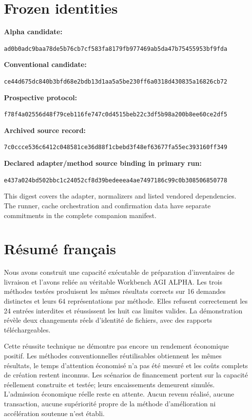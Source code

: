 \documentclass[11pt,a4paper]{article}
\begin{document}
\section*{Frozen identities}
\small
\textbf{Alpha candidate:}\par
\nolinkurl{ad0b0adc9baa78de5b76cb7cf583fa8179fb977469ab5da47b75455953bf9fda}\par
\textbf{Conventional candidate:}\par
\nolinkurl{ce44d675dc840b3bfd68e2bdb13d1aa5a5be230ff6a0318d430835a16826cb72}\par
\textbf{Prospective protocol:}\par
\nolinkurl{f78f4a02556d48f79ceb116fe747c0d4515beb22c3df5b98a200b8ee60ce2df5}\par
\textbf{Archived source record:}\par
\nolinkurl{7c0ccce536c6412c048581ce36d88f1cbebd3f48ef63677fa55ec393160ff349}\par
\textbf{Declared adapter/method source binding in primary run:}\par
\nolinkurl{e437a024bd502bbc1c24052cf8d39bedeeea4ae7497186c99c0b308506850778}
\par This digest covers the adapter, normalizers and listed vendored dependencies.
The runner, cache orchestration and confirmation data have separate commitments
in the complete companion manifest.
\normalsize

\section*{Résumé français}
Nous avons construit une capacité exécutable de préparation d'inventaires de
livraison et l'avons reliée au véritable Workbench AGI ALPHA. Les trois méthodes
testées produisent les mêmes résultats corrects sur 16 demandes distinctes et
leurs 64 représentations par méthode. Elles refusent correctement les 24 entrées
interdites et réussissent les huit cas limites valides. La démonstration révèle
deux changements réels d'identité de fichiers, avec des rapports téléchargeables.

Cette réussite technique ne démontre pas encore un rendement économique positif.
Les méthodes conventionnelles réutilisables obtiennent les mêmes résultats, le
temps d'attention économisé n'a pas été mesuré et les coûts complets de création
restent inconnus. Les scénarios de financement portent sur la capacité réellement
construite et testée; leurs encaissements demeurent simulés. L'admission économique
réelle reste en attente. Aucun revenu réalisé, aucune transaction, aucune
supériorité propre de la méthode d'amélioration ni accélération soutenue n'est
établi.
\end{document}
